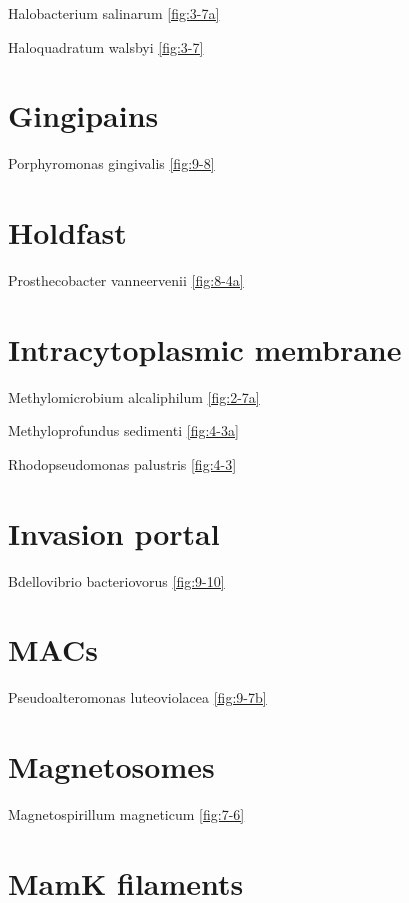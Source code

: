 \documentclass[]{tufte-book}
\begin{document}
Halobacterium salinarum \ref{fig:3-7a}

Haloquadratum walsbyi \ref{fig:3-7}

\section*{Gingipains}\label{gingipains}

Porphyromonas gingivalis \ref{fig:9-8}

\section*{Holdfast}\label{holdfast}

Prosthecobacter vanneervenii \ref{fig:8-4a}

\section*{Intracytoplasmic membrane}\label{intracytoplasmic-membrane}

Methylomicrobium alcaliphilum \ref{fig:2-7a}

Methyloprofundus sedimenti \ref{fig:4-3a}

Rhodopseudomonas palustris \ref{fig:4-3}

\section*{Invasion portal}\label{invasion-portal}

Bdellovibrio bacteriovorus \ref{fig:9-10}

\section*{MACs}\label{macs}

Pseudoalteromonas luteoviolacea \ref{fig:9-7b}

\section*{Magnetosomes}\label{magnetosomes}

Magnetospirillum magneticum \ref{fig:7-6}

\section*{MamK filaments}\label{mamk-filaments}
\end{document}
